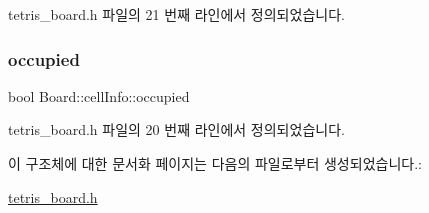 tetris\+\_\+board.\+h 파일의 21 번째 라인에서 정의되었습니다.

\mbox{\label{struct_board_1_1cell_info_a518ee0af8b662d092a1e4dffefadf27c}} 
\subsubsection{\texorpdfstring{occupied}{occupied}}
{\footnotesize\ttfamily bool Board\+::cell\+Info\+::occupied}



tetris\+\_\+board.\+h 파일의 20 번째 라인에서 정의되었습니다.



이 구조체에 대한 문서화 페이지는 다음의 파일로부터 생성되었습니다.\+:\begin{DoxyCompactItemize}
\item 
\mbox{\hyperlink{tetris__board_8h}{tetris\+\_\+board.\+h}}\end{DoxyCompactItemize}
